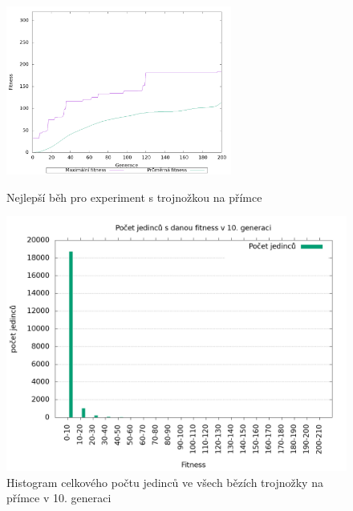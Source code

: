 \begin{figure}[h]
    \begin{minipage}[c]{0.48\linewidth}
    {\includegraphics[width=20em]{obrazky/trojnozka_primka_fitness_prubeh.png}}
        \caption{
            Nejlepší běh pro experiment s trojnožkou na přímce
        }
    \end{minipage}
    \hfill
    \begin{minipage}[c]{0.48\linewidth}
        \includegraphics[width=\linewidth]{obrazky/trojnozka_primka_fitnessHistogram10.png}
        \caption{Histogram celkového počtu jedinců ve všech bězích trojnožky na přímce v 10. generaci}
    \end{minipage}
\end{figure}

